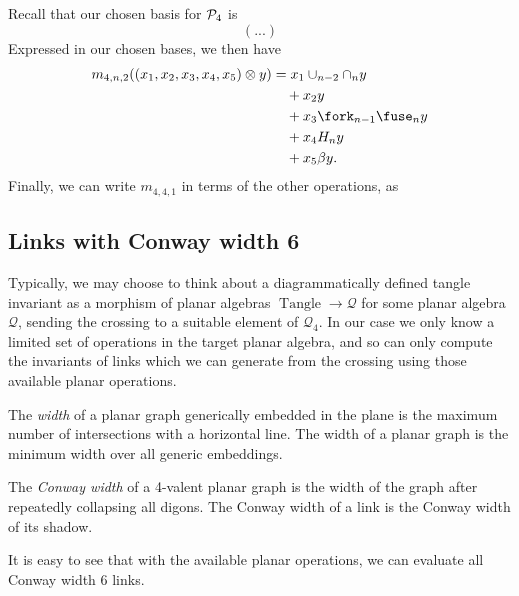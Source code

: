 \documentclass[12pt]{amsart}
\begin{document}
Recall that our chosen basis for $\mathcal{P}_4$ is
\[
  \left(
    ...
  \right)
\]
Expressed in our chosen bases, we then have 
\begin{align*}
  m_{4,n,2}((x_1, x_2, x_3, x_4, x_5) \otimes y)
    & = x_1 \cup_{n-2}\cap_n y \\
      & \quad + x_2 y \\
      & \quad + x_3 \fork_{n-1}\fuse_n y \\
      & \quad + x_4 H_n y \\
      & \quad + x_5 \beta y.
\end{align*}
Finally, we can write $m_{4,4,1}$ in terms of the other operations, as 


\subsection{Links with Conway width 6}
Typically, we may choose to think about a diagrammatically defined tangle invariant as a 
morphism of planar algebras $\operatorname{Tangle} \to \mathcal{Q}$ for some planar algebra 
$\mathcal{Q}$,
sending the crossing to a suitable element of $\mathcal{Q}_4$. In our case we only know a 
limited set of operations in the target planar algebra, and so can only compute the invariants
of links which we can generate from the crossing using those available planar operations.

\begin{definition}
The \emph{width} of a planar graph generically embedded in the plane is the maximum number of intersections with a
horizontal line. The width of a planar graph is the minimum width over all generic embeddings.

The \emph{Conway width} of a 4-valent planar graph is the width of the graph after repeatedly collapsing all digons.
The Conway width of a link is the Conway width of its shadow.
\end{definition}

It is easy to see that with the available planar operations, we can evaluate all Conway width 6 links.
\end{document}
